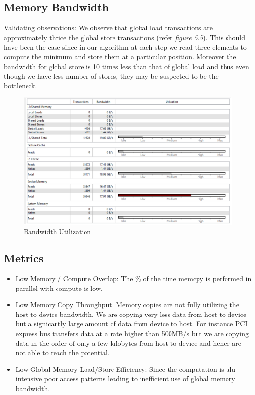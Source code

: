 \documentclass[a4paper,11pt]{report}
\begin{document}
{\subsection{Memory Bandwidth}
Validating observations:
\newline
We observe that global load transactions are approximately thrice the global store transactions (refer \textit{figure 5.5}). This should have been the case since in our algorithm at each step we read three elements to compute the minimum and store them at a particular position.
Moreover the bandwidth for global store is 10 times less than that of global load and thus even though we have less number of stores, they may be suspected to be the bottleneck.
 \begin{figure}
   \begin{center}
     \includegraphics[width=15cm]{images/utilization}
     \caption{Bandwidth Utilization}
     \label{fig:}
   \end{center}
 \end{figure}
 
\subsection{Metrics}
\begin{itemize}
  \item Low Memory / Compute Overlap: The \% of the time memcpy is performed in parallel with compute is low.
  \item Low Memory Copy Throughput: Memory copies are not fully utilizing the host to device bandwidth. We are copying very less data from host to device but a signicantly large amount of data from device to host. For instance PCI express bus transfers data at a rate higher than 500MB/s but we are copying data in the order of only a few kilobytes from host to device and hence are not able to reach the potential.
    \item Low Global Memory Load/Store Efficiency: Since the computation is alu intensive poor access patterns leading to inefficient use of global memory bandwidth.
    

\end{itemize}}
\end{document}

